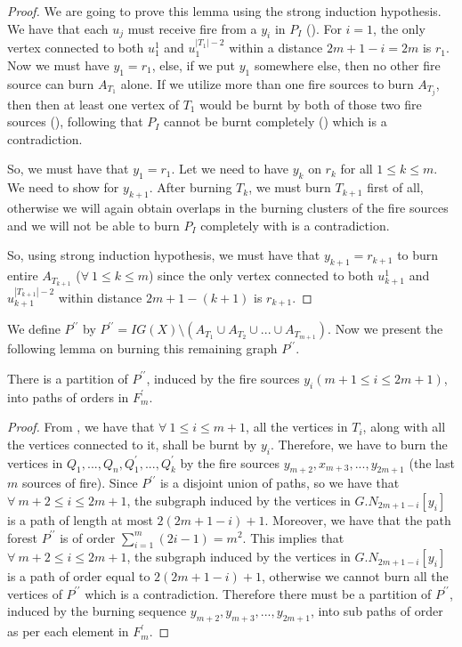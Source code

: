 \begin{proof}
We are going to prove this lemma using the strong induction hypothesis. We have that each $u_j$ must receive fire from a $y_i$ in $P_I$ (). 
For $i=1$, the only vertex connected to both $u^1_1$ and $u^{|T_1|-2}_1$ within a distance $2m+1-i=2m$ is $r_1$.
Now we must have $y_1=r_1$, else, if we put $y_1$ somewhere else, then no other fire source can burn $A_{T_1}$ alone. 
If we utilize more than one fire sources to burn $A_{T_j}$, then then at least one vertex of $T_1$ would be burnt by both of those two fire sources (), following that $P_I$ cannot be burnt completely () which is a contradiction.

So, we must have that $y_1=r_1$. Let we need to have $y_k$ on $r_k$ for all $1\leq k\le m$. We need to show for $y_{k+1}$. After burning $T_k$, we must burn $T_{k+1}$ first of all, otherwise we will again obtain overlaps in the burning clusters of the fire sources and we will not be able to burn $P_I$ completely with is a contradiction.

So, using strong induction hypothesis, we must have that $y_{k+1}=r_{k+1}$ to burn entire $A_{T_{k+1}}$ ($\forall\ 1\leq k\leq m$) since the only vertex connected to both $u^1_{k+1}$ and $u^{|T_{k+1}|-2}_{k+1}$  within distance $2m+1-(k+1)$ is $r_{k+1}$.
\end{proof}

We define $P^{\prime\prime}$ by $P^{\prime\prime} = IG(X)\setminus(A_{T_1}\cup A_{T_2}\cup ... \cup A_{T_{m+1}})$. Now we present the following lemma on burning this remaining graph $P^{\prime\prime}$.

\begin{lemma}\label{lemma:PartPFx1TO31}
There is a partition of $P^{\prime\prime}$, induced by the fire sources $y_i (m+1\leq i\leq 2m+1)$, into paths of orders in $F_m^\prime$.
\end{lemma}

\begin{proof}
From , we have that $\forall\ 1\leq i\leq m+1$, all the vertices in $T_i$, along with all the vertices connected to it, shall be burnt by $y_i$. Therefore, we have to burn the vertices in $Q_1,...,Q_n,Q_1^\prime,...,Q_k^\prime$ by the fire sources $y_{m+2},x_{m+3},...,y_{2m+1}$ (the last $m$ sources of fire). Since $P^{\prime\prime}$ is a disjoint union of paths, so we have that $\forall\ m+2\leq i\leq 2m+1$, the subgraph induced by the vertices in $G.N_{2m+1-i}[y_i]$ is a path of length at most $2(2m+1-i)+1$. Moreover, we have that the path forest $P^{\prime\prime}$ is of order $\sum_{i=1}^{m}(2i-1)=m^2$. This implies that $\forall\ m+2\leq i\leq 2m+1$, the subgraph induced by the vertices in $G.N_{2m+1-i}[y_i]$ is a path of order equal to $2(2m+1-i)+1$, otherwise we cannot burn all the vertices of $P^{\prime\prime}$ which is a contradiction. Therefore there must be a partition of $P^{\prime\prime}$, induced by the burning sequence $y_{m+2},y_{m+3},...,y_{2m+1}$, into sub paths of order as per each element in $F_m^\prime$.
\end{proof}

